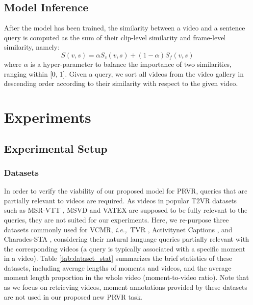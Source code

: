 \documentclass[sigconf]{acmart}
\newcommand{\ie}{\emph{i.e.,}~}
\begin{document}
\subsection{Model Inference}
After the model has been trained, the similarity between a video and a sentence query is computed as the sum of their clip-level similarity and frame-level similarity, namely:
\begin{equation}\label{eq:alpha}
    S(v,s)= \alpha S_c(v,s) + (1-\alpha) S_f(v,s)
\end{equation}
where $\alpha$ is a hyper-parameter to balance the importance of two similarities, ranging within [0, 1].
Given a query, we sort all videos from the video gallery in descending order according to their similarity with respect to the given video.




\section{Experiments} \label{sec:eval}


\subsection{Experimental Setup} \label{ssec:exp-set}


\subsubsection{Datasets}
In order to verify the viability of our proposed model for PRVR, queries that are partially relevant to videos are required. As videos in popular T2VR datasets such as MSR-VTT \cite{xu2016msr}, MSVD \cite{chen2011collecting} and VATEX \cite{wang2019vatex} are supposed to be fully relevant to the queries, they are not suited for our experiments.
Here, we re-purpose three datasets commonly used for VCMR, \ie TVR \cite{lei2020tvr}, Activitynet Captions \cite{krishna2017dense}, and Charades-STA \cite{gao2017tall}, considering their natural language queries partially relevant with the corresponding videos (a query is typically associated with a specific moment in a video).
Table \ref{tab:dataset_stat} summarizes the brief statistics of these datasets, including average lengths of moments and videos, and the average moment length proportion in the whole video (moment-to-video ratio). Note that as we focus on retrieving videos, moment annotations provided by these datasets are not used in our proposed new PRVR task.
\end{document}
